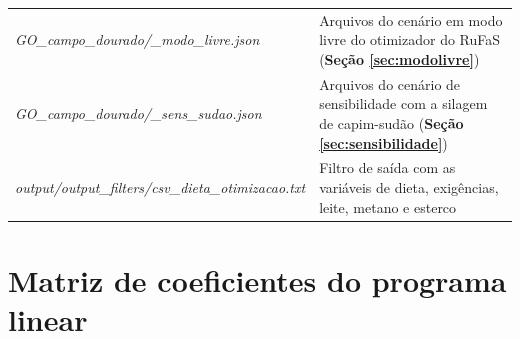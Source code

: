 \documentclass[a4paper,12pt]{article}
\begin{document}
\begin{table}[htbp]
\begin{tabular}{L{7.2cm}L{9.2cm}}
        \textit{GO\_\allowbreak campo\_\allowbreak dourado/\allowbreak *\_modo\_livre.json} & Arquivos do cenário em modo livre do otimizador do RuFaS (\textbf{Seção \ref{sec:modolivre}}) \\
        \textit{GO\_\allowbreak campo\_\allowbreak dourado/\allowbreak *\_sens\_sudao.json} & Arquivos do cenário de sensibilidade com a silagem de capim-sudão (\textbf{Seção \ref{sec:sensibilidade}}) \\
        \textit{output/\allowbreak output\_\allowbreak filters/\allowbreak csv\_\allowbreak dieta\_\allowbreak otimizacao.txt} & Filtro de saída com as variáveis de dieta, exigências, leite, metano e esterco \\
        \bottomrule
    \end{tabular}
\end{table}


\newpage
\section{Matriz de coeficientes do programa linear}\label{sec:anexomatriz}
\end{document}

